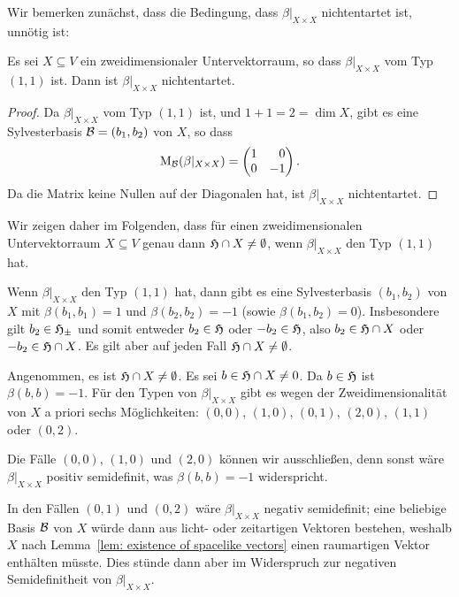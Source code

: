 \documentclass[a4paper,10pt,numbers=noenddot]{scrartcl}
\begin{document}
Wir bemerken zunächst, dass die Bedingung, dass $\beta|_{X \times X}$ nichtentartet ist, unnötig ist:


\begin{lemma}
  Es sei $X \subseteq V$ ein zweidimensionaler Untervektorraum, so dass $\beta|_{X \times X}$ vom Typ $(1,1)$ ist.
  Dann ist $\beta|_{X \times X}$ nichtentartet.
\end{lemma}
\begin{proof}
  Da $\beta|_{X \times X}$ vom Typ $(1,1)$ ist, und $1 + 1 = 2 = \dim X$, gibt es eine Sylvesterbasis $\mathcal{B} = (b_1, b_2)$ von $X$, so dass
  \[
    \Mat_\mc{B}(\beta|_{X \times X})
    =
    \begin{pmatrix*}[r]
      1 &  0  \\
      0 & -1
    \end{pmatrix*}.
  \]
  Da die Matrix keine Nullen auf der Diagonalen hat, ist $\beta|_{X \times X}$ nichtentartet.
\end{proof}


Wir zeigen daher im Folgenden, dass für einen zweidimensionalen Untervektorraum $X \subseteq V$ genau dann $\mathfrak{H} \cap X \neq \emptyset$, wenn $\beta|_{X \times X}$ den Typ $(1,1)$ hat.

Wenn $\beta|_{X \times X}$ den Typ $(1,1)$ hat, dann gibt es eine Sylvesterbasis $(b_1, b_2)$ von $X$ mit $\beta(b_1, b_1) = 1$ und $\beta(b_2, b_2) = -1$ (sowie $\beta(b_1, b_2) = 0$).
Insbesondere gilt $b_2 \in \mathfrak{H}_{\pm}$ und somit entweder $b_2 \in \mathfrak{H}$ oder $-b_2 \in \mathfrak{H}$, also $b_2 \in \mathfrak{H} \cap X$ oder $-b_2 \in \mathfrak{H} \cap X$.
Es gilt aber auf jeden Fall $\mathfrak{H} \cap X \neq \emptyset$.

Angenommen, es ist $\mathfrak{H} \cap X \neq \emptyset$.
Es sei $b \in \mathfrak{H} \cap X \neq 0$.
Da $b \in \mathfrak{H}$ ist $\beta(b,b) = -1$.
Für den Typen von $\beta|_{X \times X}$ gibt es wegen der Zweidimensionalität von $X$ a priori sechs Möglichkeiten: $(0,0)$, $(1,0)$, $(0,1)$, $(2,0)$, $(1,1)$ oder $(0,2)$.

Die Fälle $(0,0)$, $(1,0)$ und $(2,0)$ können wir ausschließen, denn sonst wäre $\beta|_{X \times X}$ positiv semidefinit, was $\beta(b,b) = -1$ widerspricht.

In den Fällen $(0,1)$ und $(0,2)$ wäre $\beta|_{X \times X}$ negativ semidefinit; eine beliebige Basis $\mathcal{B}$ von $X$ würde dann aus licht- oder zeitartigen Vektoren bestehen, weshalb $X$ nach Lemma~\ref{lem: existence of spacelike vectors} einen raumartigen Vektor enthälten müsste.
Dies stünde dann aber im Widerspruch zur negativen Semidefinitheit von $\beta|_{X \times X}$.
\end{document}
